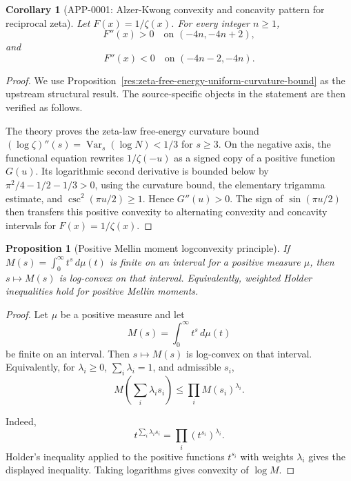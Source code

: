 \documentclass[11pt]{article}
\numberwithin{equation}{section}
\newtheorem{proposition}[theorem]{Proposition}
\newtheorem{corollary}[theorem]{Corollary}
\theoremstyle{definition}
\theoremstyle{remark}
\newcommand{\1}{\mathbf 1}
\begin{document}
\begin{corollary}[APP-0001: Alzer-Kwong convexity and concavity pattern for reciprocal zeta]
\label{thm:alzer-kwong}
Let \(F(x)=1/\zeta(x)\).  For every integer \(n\ge1\),
\begin{equation}
\label{eq:alzer-kwong-convex}
F''(x)>0\quad\text{on }(-4n,-4n+2),
\end{equation}
and
\begin{equation}
\label{eq:alzer-kwong-concave}
F''(x)<0\quad\text{on }(-4n-2,-4n).
\end{equation}


\end{corollary}

\begin{proof}
We use Proposition~\ref{res:zeta-free-energy-uniform-curvature-bound} as the upstream structural result. The source-specific objects in the statement are then verified as follows.

The theory proves the zeta-law free-energy curvature bound \((\log\zeta)''(s)=\operatorname{Var}_s(\log N)<1/3\) for \(s\ge3\). On the negative axis, the functional equation rewrites \(1/\zeta(-u)\) as a signed copy of a positive function \(G(u)\). Its logarithmic second derivative is bounded below by \(\pi^2/4-1/2-1/3>0\), using the curvature bound, the elementary trigamma estimate, and \(\csc^2(\pi u/2)\ge1\). Hence \(G''(u)>0\). The sign of \(\sin(\pi u/2)\) then transfers this positive convexity to alternating convexity and concavity intervals for \(F(x)=1/\zeta(x)\).
\end{proof}

\begin{proposition}[Positive Mellin moment logconvexity principle]
\label{res:positive-mellin-moment-logconvexity-principle}
If \(M(s)=\int_0^\infty t^{s}\,d\mu(t)\) is finite on an interval for a positive measure \(\mu\), then \(s\mapsto M(s)\) is log-convex on that interval. Equivalently, weighted Holder inequalities hold for positive Mellin moments.
\end{proposition}

\begin{proof}
Let \(\mu\) be a positive measure and let
\[
M(s)=\int_0^\infty t^s\,d\mu(t)
\]
be finite on an interval. Then \(s\mapsto M(s)\) is log-convex on that interval. Equivalently, for \(\lambda_i\ge0\), \(\sum_i\lambda_i=1\), and admissible \(s_i\),
\[
M\left(\sum_i\lambda_i s_i\right)\le \prod_i M(s_i)^{\lambda_i}.
\]

Indeed,
\[
t^{\sum_i\lambda_i s_i}=\prod_i (t^{s_i})^{\lambda_i}.
\]
Holder's inequality applied to the positive functions \(t^{s_i}\) with weights \(\lambda_i\) gives the displayed inequality. Taking logarithms gives convexity of \(\log M\).
\end{proof}
\end{document}
